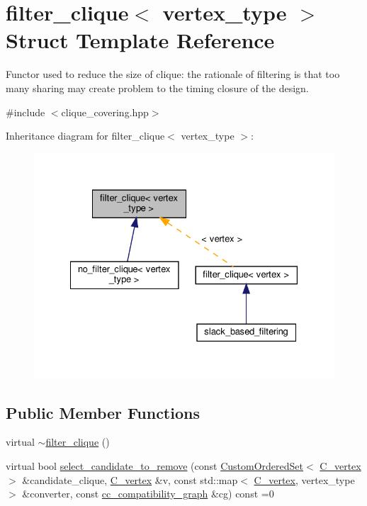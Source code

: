 \hypertarget{structfilter__clique}{}\section{filter\+\_\+clique$<$ vertex\+\_\+type $>$ Struct Template Reference}
\label{structfilter__clique}


Functor used to reduce the size of clique\+: the rationale of filtering is that too many sharing may create problem to the timing closure of the design.  




{\ttfamily \#include $<$clique\+\_\+covering.\+hpp$>$}



Inheritance diagram for filter\+\_\+clique$<$ vertex\+\_\+type $>$\+:
\nopagebreak
\begin{figure}[H]
\begin{center}
\leavevmode
\includegraphics[width=328pt]{d9/d7c/structfilter__clique__inherit__graph}
\end{center}
\end{figure}
\subsection*{Public Member Functions}
\begin{DoxyCompactItemize}
\item 
virtual \hyperlink{structfilter__clique_ad5bed84bb6e44a26d2ac630bd824bdc7}{$\sim$filter\+\_\+clique} ()
\item 
virtual bool \hyperlink{structfilter__clique_aaeef789b709e45c93269c6b137ea00ff}{select\+\_\+candidate\+\_\+to\+\_\+remove} (const \hyperlink{classCustomOrderedSet}{Custom\+Ordered\+Set}$<$ \hyperlink{clique__covering__graph_8hpp_a9cb45047ea8c5ed95a8cfa90494345aa}{C\+\_\+vertex} $>$ \&candidate\+\_\+clique, \hyperlink{clique__covering__graph_8hpp_a9cb45047ea8c5ed95a8cfa90494345aa}{C\+\_\+vertex} \&v, const std\+::map$<$ \hyperlink{clique__covering__graph_8hpp_a9cb45047ea8c5ed95a8cfa90494345aa}{C\+\_\+vertex}, vertex\+\_\+type $>$ \&converter, const \hyperlink{clique__covering__graph_8hpp_aa88e9419fe776ef37020cacd507cc4ad}{cc\+\_\+compatibility\+\_\+graph} \&cg) const =0
\end{DoxyCompactItemize}


